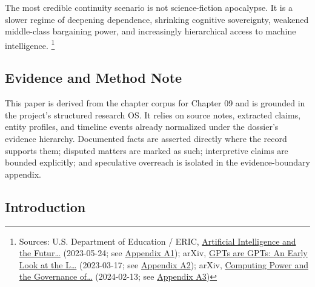 \documentclass[
  american,
  11pt,
  letterpaper,
]{article}
\begin{document}
The most credible continuity scenario is not science-fiction apocalypse.
It is a slower regime of deepening dependence, shrinking cognitive
sovereignty, weakened middle-class bargaining power, and increasingly
hierarchical access to machine intelligence. \footnote{Sources: U.S.
  Department of Education / ERIC,
  \href{https://eric.ed.gov/?id=ED631097}{Artificial Intelligence and
  the Futur\ldots{}} (2023-05-24; see
  \hyperref[ch-09-appendix-a1-artificial-intelligence-and-the-future-of-teaching-and-learning-insights-and-recommendations]{Appendix
  A1}); arXiv, \href{https://arxiv.org/abs/2303.10130}{GPTs are GPTs: An
  Early Look at the L\ldots{}} (2023-03-17; see
  \hyperref[ch-09-appendix-a2-gpts-are-gpts-an-early-look-at-the-labor-market-impact-potential-of-large-language-models]{Appendix
  A2}); arXiv, \href{https://arxiv.org/abs/2402.08797}{Computing Power
  and the Governance of\ldots{}} (2024-02-13; see
  \hyperref[ch-09-appendix-a3-computing-power-and-the-governance-of-artificial-intelligence]{Appendix
  A3})}

\subsection{Evidence and Method Note}\label{evidence-and-method-note-9}

This paper is derived from the chapter corpus for Chapter 09 and is
grounded in the project's structured research OS. It relies on source
notes, extracted claims, entity profiles, and timeline events already
normalized under the dossier's evidence hierarchy. Documented facts are
asserted directly where the record supports them; disputed matters are
marked as such; interpretive claims are bounded explicitly; and
speculative overreach is isolated in the evidence-boundary appendix.

\subsection{Introduction}\label{introduction-9}
\end{document}

